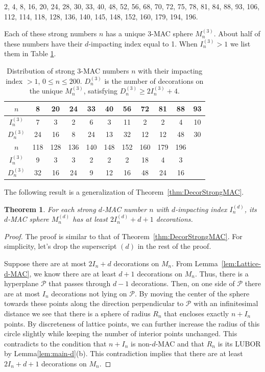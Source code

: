 \documentclass{article}
\theoremstyle{theorem}
\newtheorem{theorem}{Theorem}
\theoremstyle{definition}
\begin{document}
2, 4, 8, 16, 20, 24, 28, 30, 33, 40, 48, 52, 56, 68, 70, 72, 75, 78, 81, 84, 88, 93, 106, 112, 114, 118, 128, 136, 140, 145, 148, 152, 160, 179, 194, 196.

Each of these strong numbers $n$ has a unique $3$-MAC sphere $M_n^{(3)}$. About half of these numbers have their $d$-impacting index equal to 1. When $I_n^{(3)}>1$ we list them in Table \ref{tbl:strong-d-MAC}.

\begin{table}[h]
\caption{Distribution of strong $3$-MAC numbers $n$ with their impacting index $>1$, $0\le n\le 200$. $D_n^{(3)}$ is the number of decorations on the unique $M_n^{(3)}$, satisfying $D_n^{(3)}\ge 2I_n^{(3)}+4$.}
\centering\begin{tabular}{|c|c|c|c|c|c|c|c|c|c|c|}
\hline
$n$  & 8& 20& 24& 33& 40& 56& 72& 81& 88& 93 \\
\hline
$I_n^{(3)}$ & 7& 3& 2& 6& 3& 11& 2& 2& 4& 10\\
\hline
$D_n^{(3)}$ &24 & 16& 8& 24& 13& 32& 12& 12& 48& 30\\
\hline
$n$  &118& 128& 136& 140& 148& 152& 160& 179& 196 &\\
\hline
$I_n^{(3)}$&   9& 3& 3& 2& 2& 2& 18& 4& 3 &\\
\hline
$D_n^{(3)}$& 32& 16& 24& 9& 12& 16& 48& 24& 16 &\\
\hline
\end{tabular}
\label{tbl:strong-d-MAC}
\end{table}

The following result is a generalization of Theorem~\ref{thm:DecorStrongMAC}.

\begin{theorem}\label{thm:DecorStrong-d-MAC}
For each strong $d$-MAC number $n$ with $d$-impacting index $I_n^{(d)}$, its $d$-MAC sphere $M_n^{(d)}$ has at least $2I_n^{(d)}+d+1$ decorations.
\end{theorem}

\begin{proof}
The proof is similar to that of Theorem~\ref{thm:DecorStrongMAC}. For simplicity, let's drop the superscript $(d)$ in the rest of the proof.

Suppose there are at most $2I_n+d$ decorations on $M_n$. From Lemma~\ref{lem:Lattice-d-MAC}, we know there are at least $d+1$ decorations on $M_n$. Thus, there is a hyperplane $\mathcal P$ that passes through $d-1$ decorations. Then, on one side of $\mathcal P$ there are at most $I_n$ decorations not lying on $\mathcal P$. By moving the center of the sphere towards these points along the direction perpendicular to $\mathcal P$ with an infinitesimal distance we see that there is a sphere of radius $R_n$ that encloses exactly $n+I_n$ points. By discreteness of lattice points, we can further increase the radius of this circle slightly while keeping the number of interior points unchanged. This contradicts to the condition that $n+I_n$ is non-$d$-MAC and that $R_n$ is its LUBOR by Lemma\ref{lem:main-d}(b). This contradiction implies that there are at least $2I_n+d+1$ decorations on $M_n$.
\end{proof}
\end{document}
